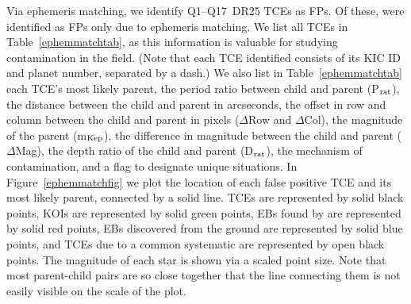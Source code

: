 











Via ephemeris matching, we identify \nephemmatch{} Q1--Q17~DR25 TCEs as FPs. Of these, \nonlyephemmatch{} were identified as FPs only due to ephemeris matching. We list all \nephemmatch{} TCEs in Table~\ref{ephemmatchtab}, as this information is valuable for studying contamination in the \kepler{} field. (Note that each TCE identified consists of its KIC ID and planet number, separated by a dash.) We also list in Table~\ref{ephemmatchtab} each TCE's most likely parent, the period ratio between child and parent (P$_{\rm rat}$), the distance between the child and parent in arcseconds, the offset in row and column between the child and parent in pixels ($\Delta$Row and $\Delta$Col), the magnitude of the parent (m$_{\rm Kep}$), the difference in magnitude between the child and parent ($\Delta$Mag), the depth ratio of the child and parent (D$_{\rm rat}$), the mechanism of contamination, and a flag to designate unique situations. In Figure~\ref{ephemmatchfig} we plot the location of each false positive TCE and its most likely parent, connected by a solid line. TCEs are represented by solid black points, KOIs are represented by solid green points, EBs found by \kepler{} are represented by solid red points, EBs discovered from the ground are represented by solid blue points, and TCEs due to a common systematic are represented by open black points. The \kepler{} magnitude of each star is shown via a scaled point size. Note that most parent-child pairs are so close together that the line connecting them is not easily visible on the scale of the plot. 


